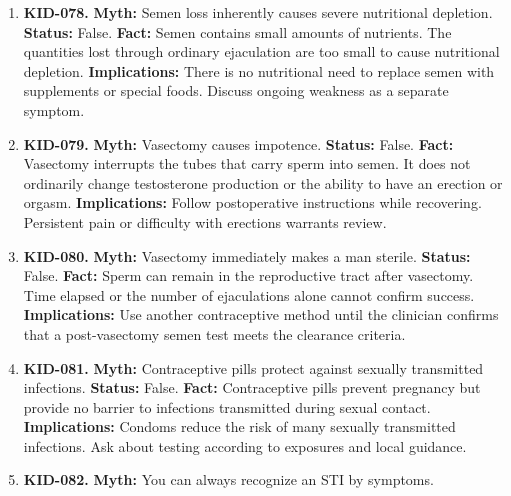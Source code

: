 \documentclass[11pt,oneside]{book}
\begin{document}
\begin{enumerate}[leftmargin=0pt,labelwidth=0pt,labelsep=0pt,itemindent=0pt]
\textbf{Implications:} Persistent fatigue deserves assessment for other causes, especially if it interferes with daily activities.
\item[] \textbf{KID-078.} \textbf{Myth:} Semen loss inherently causes severe nutritional depletion.\newline
\textbf{Status:} False.\newline
\textbf{Fact:} Semen contains small amounts of nutrients. The quantities lost through ordinary ejaculation are too small to cause nutritional depletion. \cite{ref367}\newline
\textbf{Implications:} There is no nutritional need to replace semen with supplements or special foods. Discuss ongoing weakness as a separate symptom.
\item[] \textbf{KID-079.} \textbf{Myth:} Vasectomy causes impotence.\newline
\textbf{Status:} False.\newline
\textbf{Fact:} Vasectomy interrupts the tubes that carry sperm into semen. It does not ordinarily change testosterone production or the ability to have an erection or orgasm. \cite{ref275}\newline
\textbf{Implications:} Follow postoperative instructions while recovering. Persistent pain or difficulty with erections warrants review.
\item[] \textbf{KID-080.} \textbf{Myth:} Vasectomy immediately makes a man sterile.\newline
\textbf{Status:} False.\newline
\textbf{Fact:} Sperm can remain in the reproductive tract after vasectomy. Time elapsed or the number of ejaculations alone cannot confirm success. \cite{ref275,ref368}\newline
\textbf{Implications:} Use another contraceptive method until the clinician confirms that a post-vasectomy semen test meets the clearance criteria.
\item[] \textbf{KID-081.} \textbf{Myth:} Contraceptive pills protect against sexually transmitted infections.\newline
\textbf{Status:} False.\newline
\textbf{Fact:} Contraceptive pills prevent pregnancy but provide no barrier to infections transmitted during sexual contact. \cite{ref323,ref176}\newline
\textbf{Implications:} Condoms reduce the risk of many sexually transmitted infections. Ask about testing according to exposures and local guidance.
\item[] \textbf{KID-082.} \textbf{Myth:} You can always recognize an STI by symptoms.\newline

\end{enumerate}
\end{document}
